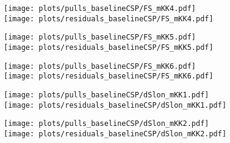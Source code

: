 \begin{subappendices}
\begin{figure}[H] 
  \centering
  \begin{multicols}{2}
  \texttt{[image: plots/pulls\_baselineCSP/FS\_mKK4.pdf]}  \\
  \texttt{[image: plots/residuals\_baselineCSP/FS\_mKK4.pdf]}
  \end{multicols}  
  \begin{multicols}{2}
  \texttt{[image: plots/pulls\_baselineCSP/FS\_mKK5.pdf]}  \\
  \texttt{[image: plots/residuals\_baselineCSP/FS\_mKK5.pdf]}
  \end{multicols}  
  \begin{multicols}{2}
  \texttt{[image: plots/pulls\_baselineCSP/FS\_mKK6.pdf]}  \\
  \texttt{[image: plots/residuals\_baselineCSP/FS\_mKK6.pdf]}
  \end{multicols}  
  \begin{multicols}{2}
  \texttt{[image: plots/pulls\_baselineCSP/dSlon\_mKK1.pdf]}  \\
  \texttt{[image: plots/residuals\_baselineCSP/dSlon\_mKK1.pdf]}
  \end{multicols}  
  \begin{multicols}{2}
  \texttt{[image: plots/pulls\_baselineCSP/dSlon\_mKK2.pdf]}  \\
  \texttt{[image: plots/residuals\_baselineCSP/dSlon\_mKK2.pdf]}
  \end{multicols}    
\end{figure}


\end{subappendices}
